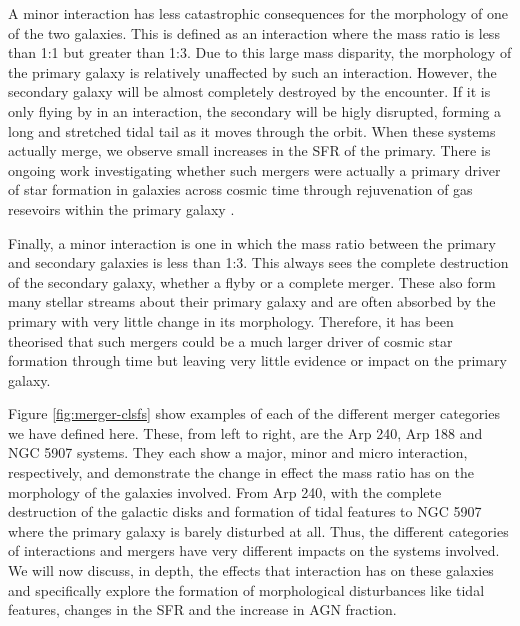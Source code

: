 A minor interaction has less catastrophic consequences for the morphology of one of the two galaxies. This is defined as an interaction where the mass ratio is less than 1:1 but greater than 1:3. Due to this large mass disparity, the morphology of the primary galaxy is relatively unaffected by such an interaction. However, the secondary galaxy will be almost completely destroyed by the encounter. If it is only flying by in an interaction, the secondary will be higly disrupted, forming a long and stretched tidal tail as it moves through the orbit. When these systems actually merge, we observe small increases in the SFR of the primary. There is ongoing work investigating whether such mergers were actually a primary driver of star formation in galaxies across cosmic time through rejuvenation of gas resevoirs within the primary galaxy \citep{2007A&A...476.1179B, 2014MNRAS.440.2944K, 2022MNRAS.511..607J}.

Finally, a minor interaction is one in which the mass ratio between the primary and secondary galaxies is less than 1:3. This always sees the complete destruction of the secondary galaxy, whether a flyby or a complete merger. These also form many stellar streams about their primary galaxy and are often absorbed by the primary with very little change in its morphology. Therefore, it has been theorised that such mergers could be a much larger driver of cosmic star formation through time but leaving very little evidence or impact on the primary galaxy. 

Figure \ref{fig:merger-clsfs} show examples of each of the different merger categories we have defined here. These, from left to right, are the Arp 240, Arp 188 and NGC 5907 systems. They each show a major, minor and micro interaction, respectively, and demonstrate the change in effect the mass ratio has on the morphology of the galaxies involved. From Arp 240, with the complete destruction of the galactic disks and formation of tidal features to NGC 5907 where the primary galaxy is barely disturbed at all. Thus, the different categories of interactions and mergers have very different impacts on the systems involved. We will now discuss, in depth, the effects that interaction has on these galaxies and specifically explore the formation of morphological disturbances like tidal features, changes in the SFR and the increase in AGN fraction.

